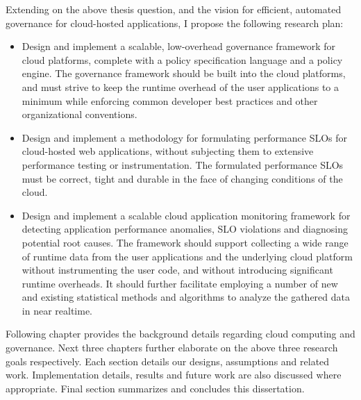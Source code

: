 Extending on the above thesis question, and the vision for efficient, automated governance for
cloud-hosted applications, I propose the following research plan:

\begin{itemize}
\item Design and implement a scalable, low-overhead governance framework for cloud platforms,
complete with a policy specification language and a policy engine. The governance framework should be
built into the cloud platforms, and must
strive to keep the runtime overhead of the user applications to a minimum while enforcing
common developer best practices and other organizational conventions.
\item Design and implement a methodology for formulating performance SLOs for cloud-hosted 
 web applications, without
 subjecting them to extensive performance testing or instrumentation. The formulated
 performance SLOs must be correct, tight and durable in the face of changing
 conditions of the cloud.
 \item Design and implement a scalable cloud application monitoring framework for detecting
application performance anomalies, SLO violations and diagnosing potential root causes. 
The framework should support collecting
 a wide range of runtime data from the user applications and the underlying cloud platform
 without instrumenting the user code, and without introducing significant runtime overheads.
 It should further facilitate employing a number of new and existing statistical methods
 and algorithms to analyze the gathered data in near realtime.
\end{itemize}

Following chapter provides the background details regarding cloud computing and governance.
Next three chapters further elaborate on the above three research goals respectively. 
Each section details our designs, assumptions and related work. Implementation details,
results and future work are also discussed where appropriate. Final section
summarizes and concludes this dissertation.